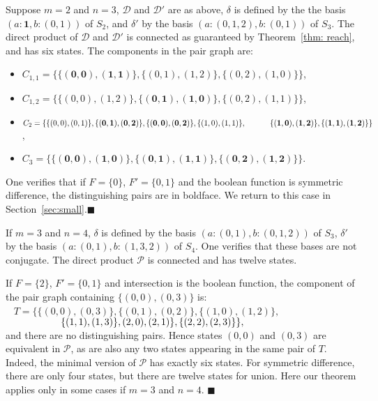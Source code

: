 \documentclass{llncs}
\newcommand{\bi}{\begin{itemize}}
\newcommand{\ei}{\end{itemize}}
\newcommand{\cD}{{\mathcal D}}
\newcommand{\cP}{{\mathcal P}}
\newcommand{\one}{{\mathbf 1}}
\newcommand{\qedb}{\hfill$\blacksquare$}
\begin{document}
\begin{example}
\label{ex:23}
Suppose $m=2$ and $n=3$, $\cD$ and $\cD'$ are as above, $\delta$ is defined by the the basis  $(a\colon \one,b \colon (0,1))$ of $S_2$, and $\delta'$ by the basis $(a\colon(0,1,2), b\colon (0,1))$ of $S_3$.
The direct product of $\cD$ and $\cD'$ is connected as guaranteed by Theorem~\ref{thm: reach}, and has six states. The
 components in the pair graph are:
\bi
\item
$C_{1,1}= \{ \mathbf{\{(0,0), (1,1)\}}, \{(0,1), (1,2)\}, \{(0,2), (1,0)\} \}$, 
\item
$C_{1,2}=\{ \{(0,0), (1,2)\}, \mathbf{\{(0,1), (1,0)\}}, \{(0,2), (1,1)\} \}$,
\item
$C_2=\{ \{(0,0), (0,1)\}, \mathbf{\{(0,1), (0,2)\}}, \mathbf{\{(0,0), (0,2)\}}, \{(1,0), (1,1)\}, \\ \mbox{\hspace{1.1cm}}  \mathbf{\{(1,0), (1,2)\}}, \mathbf{\{(1,1), (1,2)\} \}}$, 
\item
$C_3=\{ \mathbf{\{(0,0), (1,0)\}}, \mathbf{\{(0,1), (1,1)\}}, \mathbf{\{(0,2), (1,2)\}} \}$.
\ei
One verifies that if $F=\{0\}$, $F'=\{0,1\}$ and the boolean function is symmetric difference,  the distinguishing pairs are  in boldface. 
We return to this case in Section~\ref{sec:small}.\qedb
\end{example}

\begin{example}
\label{ex:34}
If $m=3$ and $n=4$, $\delta$ is defined by the basis $(a\colon (0,1),b \colon (0,1,2))$ of $S_3$,  $\delta'$ by  the basis $(a\colon(0,1),b\colon (1,3,2))$ of $S_4$. One verifies that these bases are not conjugate.
The direct product $\cP$  is connected and has twelve states.

If $F=\{2\}$, $F'=\{0,1\}$ and intersection is the boolean function,
the component of the pair graph containing $\{(0,0),(0,3)\}$ is:\\
\mbox{\hspace{1cm} } $T= \{ \{(0,0), (0,3)\}, \{(0,1), (0,2)\}, \{(1,0), (1,2)\},
$\\
$\mbox{\hspace{1.85cm} }  \{(1,1), (1,3)\}, (2,0), (2,1)\}, \{(2,2), (2,3)\} \},$\\
and there are no distinguishing pairs. Hence states $(0,0)$ and $(0,3)$ are equivalent in $\cP$, as are also any two states appearing in the same pair of $T$.
Indeed, the minimal version of $\cP$ has exactly six states.
For symmetric difference, there are only four states, but there are twelve states for union.
Here our theorem applies only in some cases if $m=3$ and $n=4$.
\qedb
\end{example}
\end{document}
